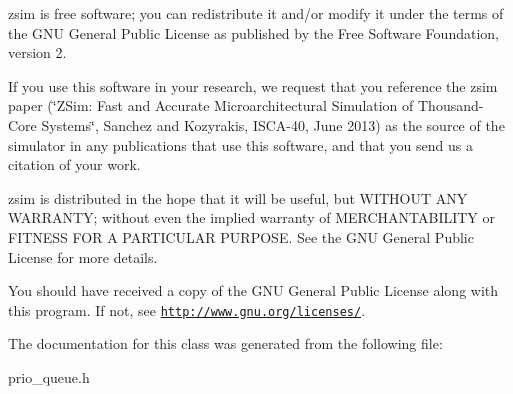 zsim is free software; you can redistribute it and/or modify it under the terms of the G\-N\-U General Public License as published by the Free Software Foundation, version 2.

If you use this software in your research, we request that you reference the zsim paper (\char`\"{}\-Z\-Sim\-: Fast and Accurate Microarchitectural Simulation of
\-Thousand-\/\-Core Systems\char`\"{}, Sanchez and Kozyrakis, I\-S\-C\-A-\/40, June 2013) as the source of the simulator in any publications that use this software, and that you send us a citation of your work.

zsim is distributed in the hope that it will be useful, but W\-I\-T\-H\-O\-U\-T A\-N\-Y W\-A\-R\-R\-A\-N\-T\-Y; without even the implied warranty of M\-E\-R\-C\-H\-A\-N\-T\-A\-B\-I\-L\-I\-T\-Y or F\-I\-T\-N\-E\-S\-S F\-O\-R A P\-A\-R\-T\-I\-C\-U\-L\-A\-R P\-U\-R\-P\-O\-S\-E. See the G\-N\-U General Public License for more details.

You should have received a copy of the G\-N\-U General Public License along with this program. If not, see \href{http://www.gnu.org/licenses/}{\tt http\-://www.\-gnu.\-org/licenses/}. 

The documentation for this class was generated from the following file\-:\begin{DoxyCompactItemize}
\item 
prio\-\_\-queue.\-h\end{DoxyCompactItemize}
